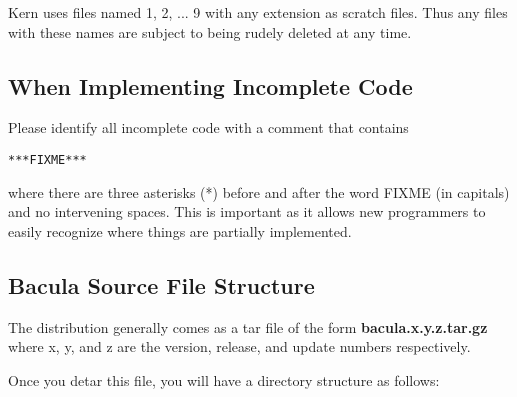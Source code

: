 Kern uses files named 1, 2, ... 9 with any extension as scratch files. Thus
any files with these names are subject to being rudely deleted at any time. 

\subsection{When Implementing Incomplete Code}

Please identify all incomplete code with a comment that contains 

\begin{verbatim}
***FIXME***
\end{verbatim} 

where there are three asterisks (*) before and after the word
FIXME (in capitals) and no intervening spaces. This is important as it allows
new programmers to easily recognize where things are partially implemented. 

\subsection{Bacula Source File Structure}

The distribution generally comes as a tar file of the form {\bf
bacula.x.y.z.tar.gz} where x, y, and z are the version, release, and update
numbers respectively. 

Once you detar this file, you will have a directory structure as follows: 

